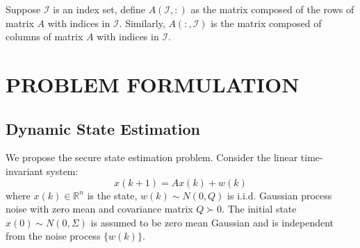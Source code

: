 \documentclass[journal]{IEEEtran}
\newcommand{\Ic}{{\mathcal{I}}}
\begin{document}
	Suppose $\Ic$ is an index set, define $A(\Ic,:)$ as the matrix composed of the rows of matrix $A$ with indices in $\Ic$. Similarly, $A(:,\Ic)$ is the matrix composed of columns of matrix $A$ with indices in $\Ic$. 
	
	\section{PROBLEM FORMULATION}
	\label{sec:problem}	
	\subsection{Dynamic State Estimation}\label{sec:basic_measure}
	We propose the secure state estimation problem. Consider the linear time-invariant system:
	$$
	x(k+1)=A x(k)+w(k)
	$$
	where $x(k) \in \mathbb{R}^{n}$ is the state, $w(k) \sim {N}(0, Q)$ is i.i.d. Gaussian process noise with zero mean and covariance matrix $Q\succ 0 .$ The initial state $x(0) \sim {N}(0, \Sigma)$ is assumed to be zero mean Gaussian and is independent from the noise process $\{w(k)\}$.
	
	
	
\end{document}
